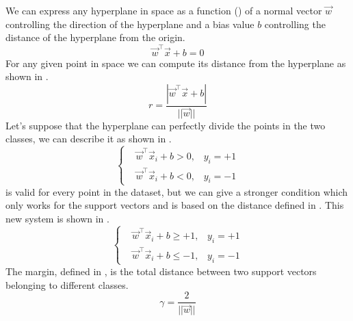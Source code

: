 We can express any hyperplane in space as a function () of a normal vector
$\vec{w}$ controlling the direction of the hyperplane and a bias value $b$ controlling the distance
of the hyperplane from the origin.
\begin{equation}
	\label{eq:hyperplane}
	\vec{w}^\top\vec{x} + b = 0
\end{equation}
For any given point in space we can compute its distance from the hyperplane as shown in
.
\begin{equation}
	\label{eq:hyperdistance}
	r = \frac{|\vec{w}^\top\vec{x} + b|}{||\vec{w}||}
\end{equation}
Let's suppose that the hyperplane can perfectly divide the points in the two classes, we can
describe it as shown in .
\begin{equation}
	\label{eq:system}
	\begin{cases}
		 & \vec{w}^\top\vec{x}_i + b > 0, \hspace{10pt} y_i = +1 \\
		 & \vec{w}^\top\vec{x}_i + b < 0, \hspace{10pt} y_i = -1
	\end{cases}
\end{equation}
 is valid for every point in the dataset, but we can give a stronger condition
which only works for the support vectors and is based on the distance defined in
. This new system is shown in .
\begin{equation}
	\label{eq:svm-system}
	\begin{cases}
		 & \vec{w}^\top\vec{x}_i + b \geq +1, \hspace{10pt} y_i = +1 \\
		 & \vec{w}^\top\vec{x}_i + b \leq -1, \hspace{10pt} y_i = -1
	\end{cases}
\end{equation}
The margin, defined in , is the total distance between two support vectors belonging to different classes.
\begin{equation}
	\label{eq:margin}
	\gamma = \frac{2}{||\vec{w}||}
\end{equation}

\medskip

